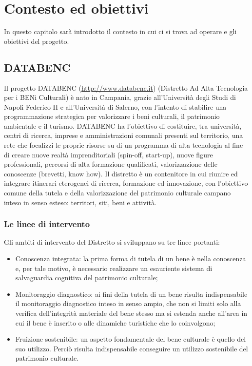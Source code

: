 
\chapter{Contesto ed obiettivi}
\label{ref:contesto}
In questo capitolo sarà introdotto il contesto in cui ci si trova ad operare e gli obiettivi del progetto.


\section{DATABENC}
Il progetto DATABENC (\url{http://www.databenc.it}) (Distretto Ad Alta Tecnologia per i BENi Culturali) è nato in Campania, grazie all'Università degli Studi di Napoli Federico II e all'Università di Salerno, con l'intento di stabilire una programmazione strategica per valorizzare i beni culturali, il patrimonio ambientale e il turismo.
DATABENC ha l'obiettivo di costituire, tra università, centri di ricerca, imprese e amministrazioni comunali presenti sul territorio, una rete che focalizzi le proprie risorse su di un programma di alta tecnologia al fine di creare nuove realtà imprenditoriali (spin-off, start-up), nuove figure professionali, percorsi di alta formazione qualificati, valorizzazione delle conoscenze (brevetti, know how). 
Il distretto è un contenitore in cui riunire ed integrare itinerari eterogenei di ricerca, formazione ed innovazione, con l'obiettivo comune della tutela e della valorizzazione del patrimonio culturale campano inteso in senso esteso: territori, siti, beni e attività. 
\subsection{Le linee di intervento}
Gli ambiti di intervento del Distretto si sviluppano su tre linee portanti: 
\begin{itemize}
\item Conoscenza integrata: la prima forma di tutela di un bene è nella conoscenza e, per tale motivo, è necessario realizzare un esauriente sistema di salvaguardia cognitiva del patrimonio culturale;
\item Monitoraggio diagnostico: ai fini della tutela di un bene risulta indispensabile il monitoraggio diagnostico inteso in senso ampio, che non si limiti solo alla verifica dell'integrità materiale del bene stesso ma si estenda anche all'area in cui il bene è inserito o alle dinamiche turistiche che lo coinvolgono;
\item Fruizione sostenibile: un aspetto fondamentale del bene culturale è quello del suo utilizzo.  Perciò risulta indispensabile conseguire un utilizzo sostenibile del patrimonio culturale.
\end{itemize}

